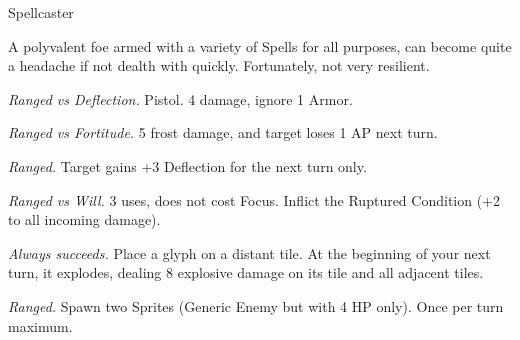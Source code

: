 \begin{monsterboxbg}{Spellcaster}

    A polyvalent foe armed with a variety of Spells for all purposes, can become quite a headache if not dealth with quickly. Fortunately, not very resilient.
    
    \rpghline
    \stats[
        STR = \stat{10}, 
        DEX = \stat{8},
        CON = \stat{10},
        INT = \stat{14},
        WIS = \stat{14},
        CHA = \stat{12},
    ]
    \rpghline

    \basics[
    armorclass = 0,
    hitpoints  = 18,
    focus      = 6,
    defenses   = {Deflection 1, Reflex 1, Fortitude 0, Will 3}
    ]
    \rpghline

    \details[%
    skills = {Kosmics 2, Lore 2},
    accuracies = {Melee -2, Ranged 4},
    ]
    \rpghline%
    

    \begin{rpg-monsteraction}
        \textit{Ranged vs Deflection.} Pistol. 4 damage, ignore 1 Armor.
    \end{rpg-monsteraction}

    \begin{rpg-monsteraction}[Frostbite]
        \textit{Ranged vs Fortitude.} 5 frost damage, and target loses 1 AP next turn.
    \end{rpg-monsteraction}

    
    \begin{rpg-monsteraction}[Toughen]
        \textit{Ranged.} Target gains +3 Deflection for the next turn only.
    \end{rpg-monsteraction}

    
    \begin{rpg-monsteraction}
        \textit{Ranged vs Will.} 3 uses, does not cost Focus. Inflict the Ruptured Condition (+2 to all incoming damage).
    \end{rpg-monsteraction}

    
    \begin{rpg-monsteraction}
        \textit{Always succeeds.} Place a glyph on a distant tile. At the beginning of your next turn, it explodes, dealing 8 explosive damage on its tile and all adjacent tiles.
    \end{rpg-monsteraction}
    
    \begin{rpg-monsteraction}
        \textit{Ranged.} Spawn two Sprites (Generic Enemy but with 4 HP only). Once per turn maximum.
    \end{rpg-monsteraction}


\end{monsterboxbg}
	






